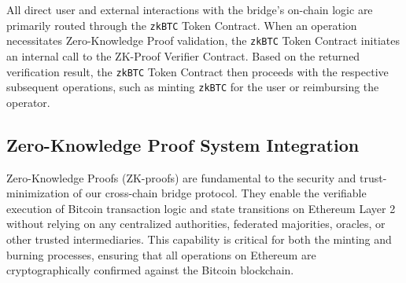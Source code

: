 \documentclass{DESSThesis}
\newcommand{\zktoken}{\texttt{zkBTC}}
\begin{document}
All direct user and external interactions with the bridge's on-chain logic are primarily routed through the \texttt{\zktoken} Token Contract. When an operation necessitates Zero-Knowledge Proof validation, the \texttt{\zktoken} Token Contract initiates an internal call to the ZK-Proof Verifier Contract. Based on the returned verification result, the \texttt{\zktoken} Token Contract then proceeds with the respective subsequent operations, such as minting \texttt{\zktoken} for the user or reimbursing the operator.

\subsection{Zero-Knowledge Proof System Integration} \label{subsec:zk-proof-integration}
Zero-Knowledge Proofs (ZK-proofs) are fundamental to the security and trust-minimization of our cross-chain bridge protocol. They enable the verifiable execution of Bitcoin transaction logic and state transitions on Ethereum Layer 2 without relying on any centralized authorities, federated majorities, oracles, or other trusted intermediaries. This capability is critical for both the minting and burning processes, ensuring that all operations on Ethereum are cryptographically confirmed against the Bitcoin blockchain.
\end{document}
